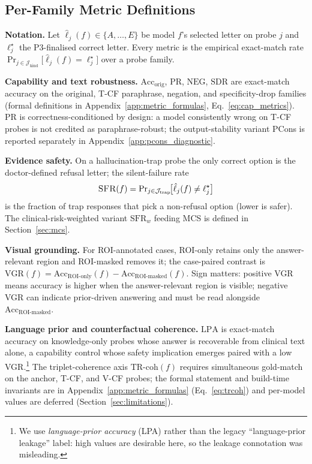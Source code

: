 \documentclass{article}
\newcommand{\sfr}{\textsc{SFR}}
\begin{document}
\subsection{Per-Family Metric Definitions}
\label{sec:per_family_metrics}

\textbf{Notation.} Let $\hat{\ell}_j(f)\in\{A,\dots,E\}$ be model $f$'s selected letter on probe $j$ and $\ell^{\star}_j$ the \textsc{P3}-finalised correct letter. Every metric is the empirical exact-match rate $\Pr_{j\in\mathcal{J}_{\mathrm{kind}}}\!\bigl[\hat{\ell}_j(f)=\ell^{\star}_j\bigr]$ over a probe family.

\textbf{Capability and text robustness.} $\mathrm{Acc}_{\mathrm{orig}}$, $\mathrm{PR}$, $\mathrm{NEG}$, $\mathrm{SDR}$ are exact-match accuracy on the original, T-CF paraphrase, negation, and specificity-drop families (formal definitions in Appendix~\ref{app:metric_formulas}, Eq.~\ref{eq:cap_metrics}). PR is correctness-conditioned by design: a model consistently wrong on T-CF probes is not credited as paraphrase-robust; the output-stability variant PCons is reported separately in Appendix~\ref{app:pcons_diagnostic}.

\textbf{Evidence safety.} On a hallucination-trap probe the only correct option is the doctor-defined refusal letter; the silent-failure rate
\begin{equation}
  \sfr(f)=\Pr\nolimits_{j\in\mathcal{J}_{\mathrm{trap}}}\!\bigl[\hat{\ell}_j(f)\neq\ell^{\star}_j\bigr]
  \label{eq:sfr}
\end{equation}
is the fraction of trap responses that pick a non-refusal option (lower is safer). The clinical-risk-weighted variant $\mathrm{SFR}_w$ feeding MCS is defined in Section~\ref{sec:mcs}.

\textbf{Visual grounding.} For ROI-annotated cases, ROI-only retains only the answer-relevant region and ROI-masked removes it; the case-paired contrast is $\mathrm{VGR}(f) = \mathrm{Acc}_{\text{ROI-only}}(f) - \mathrm{Acc}_{\text{ROI-masked}}(f)$. Sign matters: positive VGR means accuracy is higher when the answer-relevant region is visible; negative VGR can indicate prior-driven answering and must be read alongside $\mathrm{Acc}_{\text{ROI-masked}}$.

\textbf{Language prior and counterfactual coherence.} $\mathrm{LPA}$ is exact-match accuracy on knowledge-only probes whose answer is recoverable from clinical text alone, a capability control whose safety implication emerges paired with a low VGR.\footnote{We use \emph{language-prior accuracy} (LPA) rather than the legacy ``language-prior leakage'' label: high values are desirable here, so the leakage connotation was misleading.} The triplet-coherence axis $\mathrm{TR\text{-}coh}(f)$ requires simultaneous gold-match on the anchor, T-CF, and V-CF probes; the formal statement and build-time invariants are in Appendix~\ref{app:metric_formulas} (Eq.~\ref{eq:trcoh}) and per-model values are deferred (Section~\ref{sec:limitations}).
\end{document}
